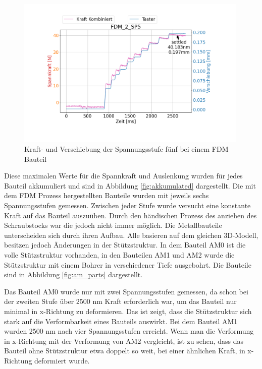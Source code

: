 \begin{figure}[H]
    \centering
    \includegraphics[width=0.99\textwidth]{images/spannkraftstufen_single.png}
    \caption{Kraft- und Verschiebung der Spannungsstufe fünf bei einem FDM Bauteil}
    \label{fig:single}
\end{figure}

Diese maximalen Werte für die Spannkraft und Auslenkung wurden für jedes Bauteil 
akkumuliert und sind in Abbildung \ref{fig:akkumulated} dargestellt.
Die mit dem FDM Prozess hergestellten Bauteile wurden mit jeweils sechs Spannungsstufen 
gemessen. Zwischen jeder Stufe wurde versucht eine konstante Kraft auf das Bauteil 
auszuüben. Durch den händischen Prozess des anziehen des Schraubstocks war die jedoch 
nicht immer möglich. 
Die Metallbauteile unterscheiden sich durch ihren Aufbau. Alle basieren auf dem gleichen
3D-Modell, besitzen jedoch Änderungen in der Stützstruktur.
In dem Bauteil AM0 ist die volle Stützstruktur vorhanden, in den Bauteilen 
AM1 und AM2 wurde die Stützstruktur mit einem Bohrer in verschiedener Tiefe
ausgebohrt. Die Bauteile sind in Abbildung \ref{fig:am_parts} dargestellt.

Das Bauteil AM0 wurde nur mit zwei Spannungsstufen gemessen, da schon bei der zweiten 
Stufe über 2500 nm Kraft erforderlich war, um das Bauteil nur minimal in x-Richtung 
zu deformieren. Das ist zeigt, dass die Stützstruktur sich stark auf die Verformbarkeit
eines Bauteils auswirkt. Bei dem Bauteil AM1 wurden 2500 nm nach vier Spannungsstufen 
erreicht. Wenn man die Verformung in x-Richtung mit der Verformung von AM2 vergleicht, 
ist zu sehen, dass das Bauteil ohne Stützstruktur etwa doppelt so weit, bei einer 
ähnlichen Kraft, in x-Richtung deformiert wurde.

